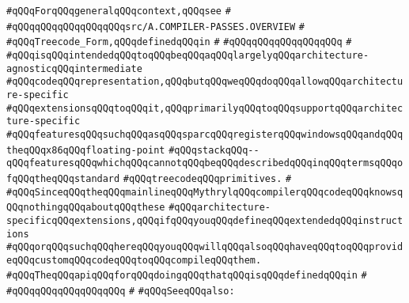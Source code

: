\verb|#qQQqForqQQqgeneralqQQqcontext,qQQqsee|\newline
\verb|#|\newline
\verb|#qQQqqQQqqQQqqQQqqQQqsrc/A.COMPILER-PASSES.OVERVIEW|\newline
\verb|#|\newline
\verb|#qQQqTreecode_Form,qQQqdefinedqQQqin|\newline
\verb|#|\newline
\verb|#qQQqqQQqqQQqqQQqqQQq|\newline
\verb|#|\newline
\verb|#qQQqisqQQqintendedqQQqtoqQQqbeqQQqaqQQqlargelyqQQqarchitecture-agnosticqQQqintermediate|\newline
\verb|#qQQqcodeqQQqrepresentation,qQQqbutqQQqweqQQqdoqQQqallowqQQqarchitecture-specific|\newline
\verb|#qQQqextensionsqQQqtoqQQqit,qQQqprimarilyqQQqtoqQQqsupportqQQqarchitecture-specific|\newline
\verb|#qQQqfeaturesqQQqsuchqQQqasqQQqsparcqQQqregisterqQQqwindowsqQQqandqQQqtheqQQqx86qQQqfloating-point|\newline
\verb|#qQQqstackqQQq--qQQqfeaturesqQQqwhichqQQqcannotqQQqbeqQQqdescribedqQQqinqQQqtermsqQQqofqQQqtheqQQqstandard|\newline
\verb|#qQQqtreecodeqQQqprimitives.|\newline
\verb|#|\newline
\verb|#qQQqSinceqQQqtheqQQqmainlineqQQqMythrylqQQqcompilerqQQqcodeqQQqknowsqQQqnothingqQQqaboutqQQqthese|\newline
\verb|#qQQqarchitecture-specificqQQqextensions,qQQqifqQQqyouqQQqdefineqQQqextendedqQQqinstructions|\newline
\verb|#qQQqorqQQqsuchqQQqhereqQQqyouqQQqwillqQQqalsoqQQqhaveqQQqtoqQQqprovideqQQqcustomqQQqcodeqQQqtoqQQqcompileqQQqthem.|\newline
\verb|#qQQqTheqQQqapiqQQqforqQQqdoingqQQqthatqQQqisqQQqdefinedqQQqin|\newline
\verb|#|\newline
\verb|#qQQqqQQqqQQqqQQqqQQq|\newline
\verb|#|\newline
\verb|#qQQqSeeqQQqalso:|\newline

